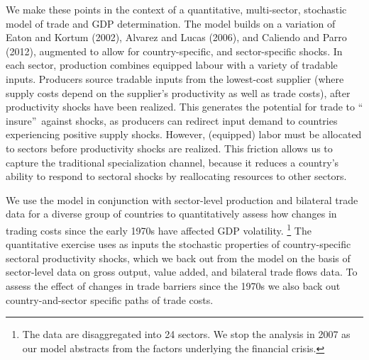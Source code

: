 \documentclass[12pt]{article}
\begin{document}
We make these points in the context of a quantitative, multi-sector,
stochastic model of trade and GDP determination. The model builds on a
variation of Eaton and Kortum (2002), Alvarez and Lucas (2006), and Caliendo
and Parro (2012), augmented to allow for country-specific, and
sector-specific shocks. In each sector, production combines equipped labour
with a variety of tradable inputs. Producers source tradable inputs from the
lowest-cost supplier (where supply costs depend on the supplier's
productivity as well as trade costs), after productivity shocks have been
realized. This generates the potential for trade to \textquotedblleft
insure\textquotedblright\ against shocks, as producers can redirect input
demand to countries experiencing positive supply shocks. However, (equipped)
labor must be allocated to sectors before productivity shocks are realized.
This friction allows us to capture the traditional specialization channel,
because it reduces a country's ability to respond to sectoral shocks by
reallocating resources to other sectors.

We use the model in conjunction with sector-level production and bilateral
trade data for a diverse group of countries to quantitatively assess how
changes in trading costs since the early 1970s have affected GDP volatility.%
\footnote{%
The data are disaggregated into 24 sectors. We stop the analysis in 2007 as
our model abstracts from the factors underlying the financial crisis.} The
quantitative exercise uses as inputs the stochastic properties of
country-specific sectoral productivity shocks, which we back out from the
model on the basis of sector-level data on gross output, value added, and
bilateral trade flows data. To assess the effect of changes in trade
barriers since the 1970s we also back out country-and-sector specific paths
of trade costs.
\end{document}
